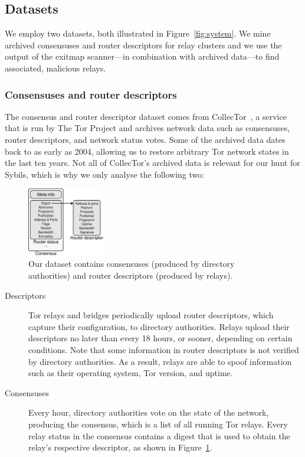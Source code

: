 \subsection{Datasets}
\label{sec:datasets}
We employ two datasets, both illustrated in Figure~\ref{fig:system}.  We mine
archived consensuses and router descriptors for relay clusters and we use the
output of the exitmap scanner---in combination with archived data---to find
associated, malicious relays.

\subsubsection{Consensuses and router descriptors}
The consensus and router descriptor dataset comes from
CollecTor~\cite{collector}, a service that is run by The Tor Project and
archives network data such as consensuses, router descriptors, and network
status votes.  Some of the archived data dates back to as early as 2004,
allowing us to restore arbitrary Tor network states in the last ten years.  Not
all of CollecTor's archived data is relevant for our hunt for Sybils, which is
why we only analyse the following two:

\begin{figure}[t]
	\centering
	\includegraphics[width=0.3\textwidth]{diagrams/data_sets.pdf}
	\caption{Our dataset contains consensuses (produced by directory
		authorities) and router descriptors (produced by relays).}
	\label{fig:datasets}
\end{figure}

\begin{description}
	\item[Descriptors] Tor relays and bridges periodically upload router
		descriptors, which capture their configuration, to directory
		authorities.  Relays upload their descriptors no later than every 18
		hours, or sooner, depending on certain conditions.  Note that some
		information in router descriptors is not verified by directory
		authorities.  As a result, relays are able to spoof information such as
		their operating system, Tor version, and uptime.

	\item[Consensuses] Every hour, directory authorities vote on the state of
		the network, producing the consensus, which is a list of all running Tor
		relays.  Every relay status in the consensus contains a digest that is
		used to obtain the relay's respective descriptor, as shown in
		Figure~\ref{fig:datasets}.
\end{description}

